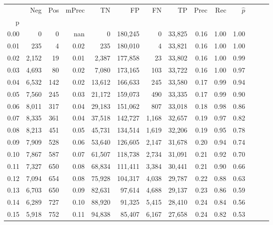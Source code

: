 \begin{tabular}{rrrrrrrrrrrrrr}
\toprule
{} &    Neg &  Pos & mPrec &       TN &       FP &      FN &      TP &  Prec &   Rec & $\hat{p}$ \\
p    &        &      &       &          &          &         &         &       &       &           \\
\midrule
0.00 &      0 &    0 &   nan &        0 &  180,245 &       0 &  33,825 &  0.16 &  1.00 &      1.00 \\
0.01 &    235 &    4 &  0.02 &      235 &  180,010 &       4 &  33,821 &  0.16 &  1.00 &      1.00 \\
0.02 &  2,152 &   19 &  0.01 &    2,387 &  177,858 &      23 &  33,802 &  0.16 &  1.00 &      0.99 \\
0.03 &  4,693 &   80 &  0.02 &    7,080 &  173,165 &     103 &  33,722 &  0.16 &  1.00 &      0.97 \\
0.04 &  6,532 &  142 &  0.02 &   13,612 &  166,633 &     245 &  33,580 &  0.17 &  0.99 &      0.94 \\
0.05 &  7,560 &  245 &  0.03 &   21,172 &  159,073 &     490 &  33,335 &  0.17 &  0.99 &      0.90 \\
0.06 &  8,011 &  317 &  0.04 &   29,183 &  151,062 &     807 &  33,018 &  0.18 &  0.98 &      0.86 \\
0.07 &  8,335 &  361 &  0.04 &   37,518 &  142,727 &   1,168 &  32,657 &  0.19 &  0.97 &      0.82 \\
0.08 &  8,213 &  451 &  0.05 &   45,731 &  134,514 &   1,619 &  32,206 &  0.19 &  0.95 &      0.78 \\
0.09 &  7,909 &  528 &  0.06 &   53,640 &  126,605 &   2,147 &  31,678 &  0.20 &  0.94 &      0.74 \\
0.10 &  7,867 &  587 &  0.07 &   61,507 &  118,738 &   2,734 &  31,091 &  0.21 &  0.92 &      0.70 \\
0.11 &  7,327 &  650 &  0.08 &   68,834 &  111,411 &   3,384 &  30,441 &  0.21 &  0.90 &      0.66 \\
0.12 &  7,094 &  654 &  0.08 &   75,928 &  104,317 &   4,038 &  29,787 &  0.22 &  0.88 &      0.63 \\
0.13 &  6,703 &  650 &  0.09 &   82,631 &   97,614 &   4,688 &  29,137 &  0.23 &  0.86 &      0.59 \\
0.14 &  6,289 &  727 &  0.10 &   88,920 &   91,325 &   5,415 &  28,410 &  0.24 &  0.84 &      0.56 \\
0.15 &  5,918 &  752 &  0.11 &   94,838 &   85,407 &   6,167 &  27,658 &  0.24 &  0.82 &      0.53 \\

\end{tabular}
